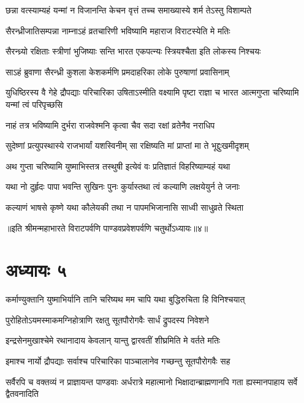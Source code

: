 \twolineshloka
{छन्ना वत्स्याम्यहं यन्मां न विजानन्ति केचन}
{वृत्तं तच्च समाख्यास्ये शर्म तेऽस्तु विशाम्पते}


\twolineshloka
{सैरन्ध्रीजातिसम्पन्ना नाम्नाऽहं व्रतचारिणी}
{भविष्यामि महाराज विराटस्येति मे मतिः}


\twolineshloka
{सैरन्ध्र्यो रक्षिताः स्त्रीणां भुजिष्याः सन्ति भारत}
{एकपत्न्यः स्त्रियश्चैता इति लोकस्य निश्चयः}


\twolineshloka
{साऽहं ब्रुवाणा सैरन्ध्री कुशला केशकर्मणि}
{प्रमदाहरिका लोके पुरुषाणां प्रवासिनाम्}


\threelineshloka
{युधिष्ठिरस्य वै गेहे द्रौपद्याः परिचारिका}
{उषिताऽस्मीति वक्ष्यामि पृष्टा राज्ञा च भारत}
{आत्मगुप्ता चरिष्यामि यन्मां त्वं परिपृच्छसि}


\twolineshloka
{नाहं तत्र भविष्यामि दुर्भरा राजवेश्मनि}
{कृत्वा चैव सदा रक्षां व्रतेनैव नराधिप}


\twolineshloka
{सुदेष्णां प्रत्युपस्थास्ये राजभार्यां यशस्विनीम्}
{सा रक्षिष्यति मां प्राप्तां मा ते भूद्दुःखमीदृशम्}


\twolineshloka
{अथ गुप्ता चरिष्यामि युष्माभिस्तत्र तस्थुषी}
{इत्येवं वः प्रतिज्ञातं विहरिष्याम्यहं यथा}




\twolineshloka
{यथा नो दुर्हृदः पापा भवन्ति सुखिनः पुनः}
{कुर्यास्तथा त्वं कल्याणि लक्षयेयुर्न ते जनाः}


\twolineshloka
{कल्याणं भाषसे कृष्णे यथा कौलेयकी तथा}
{न पापमभिजानासि साध्वी साधुव्रते स्थिता}

॥इति श्रीमन्महाभारते विराटपर्वणि पाण्डवप्रवेशपर्वणि चतुर्थोऽध्यायः॥४॥

\chapter{अध्यायः ५}

\twolineshloka
{कर्माण्युक्तानि युष्माभिर्यानि तानि चरिष्यथ}
{मम चापि यथा बुद्धिरुचिता हि विनिश्चयात्}


\twolineshloka
{पुरोहितोऽयमस्माकमग्निहोत्राणि रक्षतु}
{सूतपौरोगवैः सार्धं द्रुपदस्य निवेशने}


\twolineshloka
{इन्द्रसेनमुखाश्चेमे रथानादाय केवलान्}
{यान्तु द्वारवतीं शीघ्रमिति मे वर्तते मतिः}


\twolineshloka
{इमाश्च नार्यो द्रौपद्याः सर्वाश्च परिचारिका}
{पाञ्चालानेव गच्छन्तु सूतपौरोगवैः सह}


\threelineshloka
{सर्वैरपि च वक्तव्यं न प्राज्ञायन्त पाण्डवाः}
{अर्धरात्रे महात्मानो भिक्षादान्ब्राह्मणानपि}
{गता ह्यस्मानपाहाय सर्वे द्वैतवनादिति}


